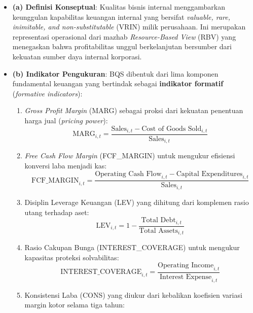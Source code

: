 \documentclass[12pt,a4paper]{article}
\providecommand{\tightlist}{%
  \setlength{\itemsep}{0pt}\setlength{\parskip}{0pt}%
}
\begin{document}
\begin{itemize}
\tightlist
\item
  \textbf{(a) Definisi Konseptual}: Kualitas bisnis internal
  menggambarkan keunggulan kapabilitas keuangan internal yang bersifat
  \emph{valuable, rare, inimitable, and non-substitutable} (VRIN) milik
  perusahaan. Ini merupakan representasi operasional dari mazhab
  \emph{Resource-Based View} (RBV) yang menegaskan bahwa profitabilitas
  unggul berkelanjutan bersumber dari kekuatan sumber daya internal
  korporasi.
\item
  \textbf{(b) Indikator Pengukuran}: BQS dibentuk dari lima komponen
  fundamental keuangan yang bertindak sebagai \textbf{indikator
  formatif} (\emph{formative indicators}):

  \begin{enumerate}
  \def\labelenumi{\arabic{enumi}.}
  \tightlist
  \item
    \emph{Gross Profit Margin} (MARG) sebagai proksi dari kekuatan
    penentuan harga jual (\emph{pricing power}): \begin{equation}
    \mathrm{MARG}_{i,t} = \frac{\text{Sales}_{i,t} - \text{Cost of Goods Sold}_{i,t}}{\text{Sales}_{i,t}}
    \end{equation}
  \item
    \emph{Free Cash Flow Margin} (FCF\_MARGIN) untuk mengukur efisiensi
    konversi laba menjadi kas: \begin{equation}
    \mathrm{FCF\_MARGIN}_{i,t} = \frac{\text{Operating Cash Flow}_{i,t} - \text{Capital Expenditures}_{i,t}}{\text{Sales}_{i,t}}
    \end{equation}
  \item
    Disiplin Leverage Keuangan (LEV) yang dihitung dari komplemen rasio
    utang terhadap aset: \begin{equation}
    \mathrm{LEV}_{i,t} = 1 - \frac{\text{Total Debt}_{i,t}}{\text{Total Assets}_{i,t}}
    \end{equation}
  \item
    Rasio Cakupan Bunga (INTEREST\_COVERAGE) untuk mengukur kapasitas
    proteksi solvabilitas: \begin{equation}
    \mathrm{INTEREST\_COVERAGE}_{i,t} = \frac{\text{Operating Income}_{i,t}}{\text{Interest Expense}_{i,t}}
    \end{equation}
  \item
    Konsistensi Laba (CONS) yang diukur dari kebalikan koefisien variasi
    margin kotor selama tiga tahun: \begin{equation}

\end{equation}
\end{enumerate}
\end{itemize}
\end{document}
